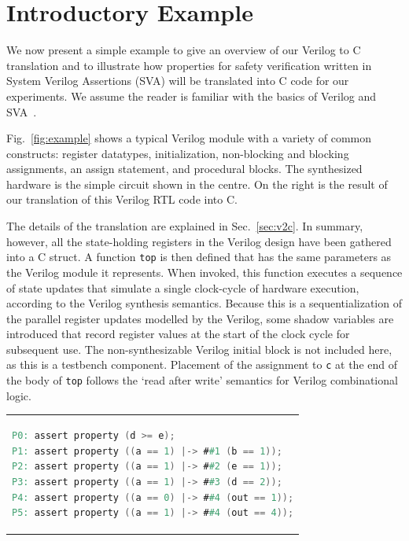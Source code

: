 \section{Introductory Example} 

We now present a simple example to give an overview of our Verilog to C translation and to illustrate how properties for safety verification written in System Verilog Assertions (SVA) will be translated into C code for our experiments. We assume the reader is familiar with the basics of Verilog and SVA~\cite{verilog}. 

Fig.~\ref{fig:example} shows a typical Verilog module with a variety of common constructs: register datatypes, initialization, non-blocking and blocking assignments, an assign statement, and procedural blocks.  The synthesized hardware is the simple circuit shown in the centre.  On the right is the result of our translation of this Verilog RTL code into C.

The details of the translation are explained in Sec.~\ref{sec:v2c}. In summary, however, all the state-holding registers in the Verilog design have been gathered into a C struct. A function \texttt{top} is then defined that has the same parameters as the Verilog module it represents. When invoked, this function executes a sequence of state updates that simulate a single clock-cycle of hardware execution, according to the Verilog synthesis semantics. Because this is a sequentialization of the parallel register updates modelled by the Verilog, some shadow variables are introduced that record register values at the start of the clock cycle for subsequent use.  The non-synthesizable Verilog initial block is not included here, as this is a testbench component.  Placement of the assignment to \texttt{c} at the end of the body of \texttt{top} follows the `read after write' semantics for Verilog combinational logic.


\begin{center}
\begin{tabular}[t]{@{}l@{}}
\begin{lstlisting}[mathescape=true,language=Verilog,basicstyle=\scriptsize\ttfamily]
P0: assert property (d >= e);
P1: assert property ((a == 1) |-> ##1 (b == 1));
P2: assert property ((a == 1) |-> ##2 (e == 1));
P3: assert property ((a == 1) |-> ##3 (d == 2));
P4: assert property ((a == 0) |-> ##4 (out == 1));
P5: assert property ((a == 1) |-> ##4 (out == 4));
\end{lstlisting}
\end{tabular}
\end{center}

